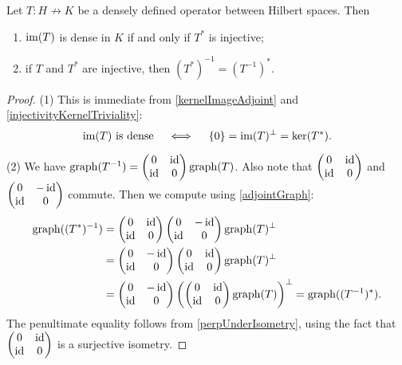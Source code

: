 \begin{proposition}
Let $T: H\not\to K$ be a densely defined operator between Hilbert spaces. Then
\begin{enumerate}
\item $\operatorname{im}(T)$ is dense in $K$ \textup{if and only if} $T^*$ is injective;
\item if $T$ and $T^*$ are injective, then $(T^*)^{-1} = (T^{-1})^*$.
\end{enumerate}
\end{proposition}
\begin{proof}
(1) This is immediate from \ref{kernelImageAdjoint} and \ref{injectivityKernelTriviality}:
\[ \text{$\operatorname{im}(T)$ is dense} \quad\iff\quad \{0\} = \operatorname{im}(T)^\perp = \ker(T^*). \]

(2) We have $\operatorname{graph}(T^{-1}) = \begin{pmatrix}
0 & \operatorname{id} \\ \operatorname{id} & 0
\end{pmatrix}\operatorname{graph}(T)$. Also note that $\begin{pmatrix}
0 & \operatorname{id} \\ \operatorname{id} & 0
\end{pmatrix}$ and $\begin{pmatrix}
0 & -\operatorname{id} \\ \operatorname{id} & 0
\end{pmatrix}$ commute. Then we compute using \ref{adjointGraph}:
\begin{align*}
\operatorname{graph}((T^*)^{-1}) &= \begin{pmatrix}
0 & \operatorname{id} \\ \operatorname{id} & 0
\end{pmatrix}\begin{pmatrix}
0 & -\operatorname{id} \\ \operatorname{id} & 0
\end{pmatrix}\operatorname{graph}(T)^\perp \\
&= \begin{pmatrix}
0 & -\operatorname{id} \\ \operatorname{id} & 0
\end{pmatrix}\begin{pmatrix}
0 & \operatorname{id} \\ \operatorname{id} & 0
\end{pmatrix}\operatorname{graph}(T)^\perp \\
&= \begin{pmatrix}
0 & -\operatorname{id} \\ \operatorname{id} & 0
\end{pmatrix}\left(\begin{pmatrix}
0 & \operatorname{id} \\ \operatorname{id} & 0
\end{pmatrix}\operatorname{graph}(T)\right)^\perp = \operatorname{graph}((T^{-1})^*).
\end{align*}
The penultimate equality follows from \ref{perpUnderIsometry}, using the fact that $\begin{pmatrix}
0 & \operatorname{id} \\ \operatorname{id} & 0
\end{pmatrix}$ is a surjective isometry.
\end{proof}

